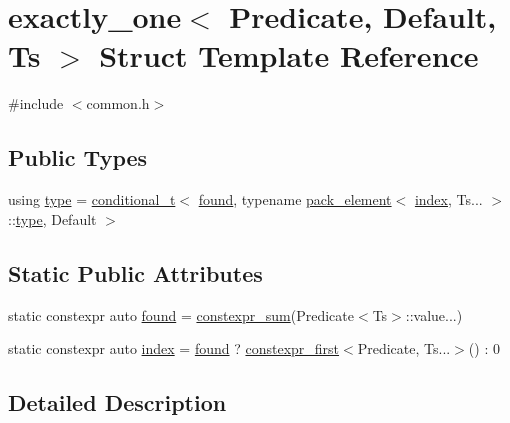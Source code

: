 \hypertarget{structexactly__one}{}\section{exactly\+\_\+one$<$ Predicate, Default, Ts $>$ Struct Template Reference}
\label{structexactly__one}


{\ttfamily \#include $<$common.\+h$>$}

\subsection*{Public Types}
\begin{DoxyCompactItemize}
\item 
using \mbox{\hyperlink{structexactly__one_ae80ab0a0e6f21d11a9a8b821cc2e352e}{type}} = \mbox{\hyperlink{detail_2common_8h_acdb0eff728aec08ed6fff07d2885ea9d}{conditional\+\_\+t}}$<$ \mbox{\hyperlink{structexactly__one_a2e88399d33d5e51e1b27f785259f408c}{found}}, typename \mbox{\hyperlink{structpack__element}{pack\+\_\+element}}$<$ \mbox{\hyperlink{_s_d_l__opengl__glext_8h_a57f14e05b1900f16a2da82ade47d0c6d}{index}}, Ts... $>$\+::\mbox{\hyperlink{structexactly__one_ae80ab0a0e6f21d11a9a8b821cc2e352e}{type}}, Default $>$
\end{DoxyCompactItemize}
\subsection*{Static Public Attributes}
\begin{DoxyCompactItemize}
\item 
static constexpr auto \mbox{\hyperlink{structexactly__one_a2e88399d33d5e51e1b27f785259f408c}{found}} = \mbox{\hyperlink{detail_2common_8h_ac8088319c435e17ebb16da84203e9e3f}{constexpr\+\_\+sum}}(Predicate$<$Ts$>$\+::value...)
\item 
static constexpr auto \mbox{\hyperlink{structexactly__one_af0f0e1092da1fbf5d87040bb9428e613}{index}} = \mbox{\hyperlink{structexactly__one_a2e88399d33d5e51e1b27f785259f408c}{found}} ? \mbox{\hyperlink{detail_2common_8h_a3b338d68ac276f1ac405ef556cca63ad}{constexpr\+\_\+first}}$<$Predicate, Ts...$>$() \+: 0
\end{DoxyCompactItemize}


\subsection{Detailed Description}
